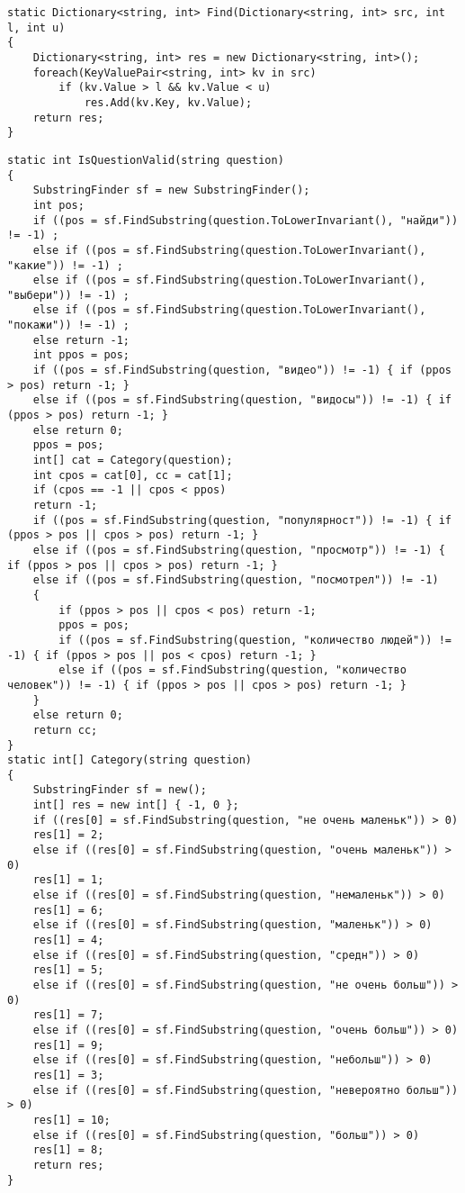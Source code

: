 \begin{lstlisting}[label=lst:bf, caption=Реализация алгоритма полного перебора поиска по словарю]
static Dictionary<string, int> Find(Dictionary<string, int> src, int l, int u)
{
	Dictionary<string, int> res = new Dictionary<string, int>();
	foreach(KeyValuePair<string, int> kv in src)
		if (kv.Value > l && kv.Value < u)
			res.Add(kv.Key, kv.Value);
	return res;
}
\end{lstlisting}
\begin{lstlisting}[label=lst:main, caption=Анализирующие вопрос методы]
static int IsQuestionValid(string question)
{
	SubstringFinder sf = new SubstringFinder();
	int pos;
	if ((pos = sf.FindSubstring(question.ToLowerInvariant(), "найди")) != -1) ;
	else if ((pos = sf.FindSubstring(question.ToLowerInvariant(), "какие")) != -1) ;
	else if ((pos = sf.FindSubstring(question.ToLowerInvariant(), "выбери")) != -1) ;
	else if ((pos = sf.FindSubstring(question.ToLowerInvariant(), "покажи")) != -1) ;
	else return -1;
	int ppos = pos;
	if ((pos = sf.FindSubstring(question, "видео")) != -1) { if (ppos > pos) return -1; }
	else if ((pos = sf.FindSubstring(question, "видосы")) != -1) { if (ppos > pos) return -1; }
	else return 0;
	ppos = pos;
	int[] cat = Category(question);
	int cpos = cat[0], cc = cat[1];
	if (cpos == -1 || cpos < ppos)
	return -1;
	if ((pos = sf.FindSubstring(question, "популярност")) != -1) { if (ppos > pos || cpos > pos) return -1; }
	else if ((pos = sf.FindSubstring(question, "просмотр")) != -1) { if (ppos > pos || cpos > pos) return -1; }
	else if ((pos = sf.FindSubstring(question, "посмотрел")) != -1)
	{
		if (ppos > pos || cpos < pos) return -1;
		ppos = pos;
		if ((pos = sf.FindSubstring(question, "количество людей")) != -1) { if (ppos > pos || pos < cpos) return -1; }
		else if ((pos = sf.FindSubstring(question, "количество человек")) != -1) { if (ppos > pos || cpos > pos) return -1; }
	}
	else return 0;
	return cc;
}
static int[] Category(string question)
{
	SubstringFinder sf = new();
	int[] res = new int[] { -1, 0 };
	if ((res[0] = sf.FindSubstring(question, "не очень маленьк")) > 0)
	res[1] = 2;
	else if ((res[0] = sf.FindSubstring(question, "очень маленьк")) > 0)
	res[1] = 1;
	else if ((res[0] = sf.FindSubstring(question, "немаленьк")) > 0) 
	res[1] = 6;
	else if ((res[0] = sf.FindSubstring(question, "маленьк")) > 0) 
	res[1] = 4;
	else if ((res[0] = sf.FindSubstring(question, "средн")) > 0)
	res[1] = 5;
	else if ((res[0] = sf.FindSubstring(question, "не очень больш")) > 0) 
	res[1] = 7;
	else if ((res[0] = sf.FindSubstring(question, "очень больш")) > 0)
	res[1] = 9;
	else if ((res[0] = sf.FindSubstring(question, "небольш")) > 0) 
	res[1] = 3;
	else if ((res[0] = sf.FindSubstring(question, "невероятно больш")) > 0)
	res[1] = 10;
	else if ((res[0] = sf.FindSubstring(question, "больш")) > 0) 
	res[1] = 8;
	return res;
}
\end{lstlisting}

